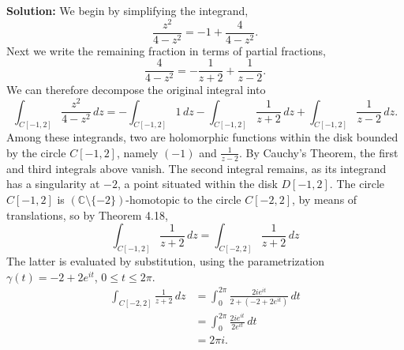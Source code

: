 \documentclass[12pt,oneside]{exam}
\begin{document}
\noindent \textbf{Solution:} We begin by simplifying the integrand, 
\begin{equation*}
\frac{z^2}{4-z^2}  = -1 + \frac{4}{4-z^2}.
\end{equation*}
Next we write the remaining fraction in terms of partial fractions, 
\begin{equation*}
\frac{4}{4-z^2} = -\frac{1}{z+2} + \frac{1}{z-2}.
\end{equation*}
We can therefore decompose the original integral into 
\begin{equation*}
\int_{C[-1,2]} \frac{z^2}{4-z^2} \, dz = -\int_{C[-1,2]} 1\, dz - \int_{C[-1,2]} \frac{1}{z+2} \, dz+ \int_{C[-1,2]} \frac{1}{z-2} \, dz.
\end{equation*}
Among these integrands, two are holomorphic functions within the disk bounded by the circle $C[-1,2]$, namely $(-1)$ and $\frac{1}{z-2}$. By Cauchy's Theorem, the first and third integrals above vanish. The second integral remains, as its integrand has a singularity at $-2$, a point situated within the disk $D[-1,2]$. The circle $C[-1,2]$ is $(\mathbb{C}\setminus \{-2\})$-homotopic to the circle $C[-2,2]$, by means of translations, so by Theorem 4.18, 
\begin{equation*}
\int_{C[-1,2]} \frac{1}{z+2} \, dz = \int_{C[-2,2]} \frac{1}{z+2}\, dz
\end{equation*}
The latter is evaluated by substitution, using the parametrization $\gamma(t)=-2+2e^{it}$, $0 \leq t \leq 2\pi$.
\begin{align*}
\int_{C[-2,2]} \frac{1}{z+2}\, dz & = \int_{0}^{2\pi} \frac{2ie^{it}}{2+(-2+2e^{it})}\, dt\\
& = \int_{0}^{2\pi} \frac{2ie^{it}}{2e^{it}}\, dt\\
& = 2\pi i.
\end{align*}
\end{document}
